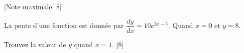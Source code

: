 \begin{question}
  \hspace*{\fill} [Note maximale: 8]\par
  \noindent La pente d’une fonction est donnée par $\dfrac{dy}{dx} = 10e^{2x - 5}$. Quand $x = 0$ et $y = 8$.\par
  \medskip
  \noindent Trouvez la valeur de $y$  quand $x = 1$.\hspace*{\fill} [8]\par
\end{question}
